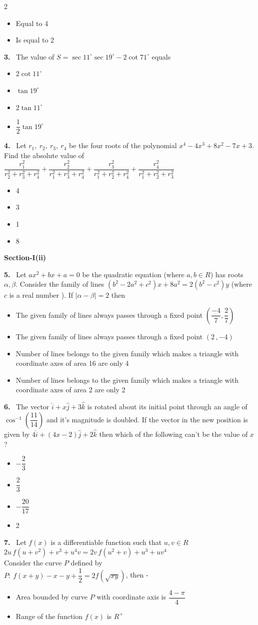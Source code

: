 \documentclass[10pt]{extarticle}
\newcommand{\sect}[1]{\par\smallskip\noindent\textbf{#1}\par}
\newcommand{\qn}[1]{\par\smallskip\noindent\textbf{#1.}~}
\newenvironment{qoptions}{\begin{itemize}[leftmargin=1.8em,itemsep=1pt,topsep=2pt,label={}]}{\end{itemize}}
\newcommand{\opt}[2]{\item[(#1)] #2}
\begin{document}
\begin{multicols}{2}
\begin{qoptions}
\opt{C}{Equal to 4}
\opt{D}{Is equal to 2}
\end{qoptions}
\qn{3} The value of $S=\sec11^\circ\sec19^\circ-2\cot71^\circ$ equals
\begin{qoptions}
\opt{A}{$2\cot11^\circ$}
\opt{B}{$\tan19^\circ$}
\opt{C}{$2\tan11^\circ$}
\opt{D}{$\dfrac12\tan19^\circ$}
\end{qoptions}
\qn{4} Let $r_1,\ r_2,\ r_3,\ r_4$ be the four roots of the polynomial $x^4-4x^3+8x^2-7x+3$. Find the absolute value of $\dfrac{r_1^2}{r_2^2+r_3^2+r_4^2}+\dfrac{r_2^2}{r_1^2+r_3^2+r_4^2}+\dfrac{r_3^2}{r_1^2+r_2^2+r_4^2}+\dfrac{r_4^2}{r_1^2+r_2^2+r_3^2}$
\begin{qoptions}
\opt{A}{4}
\opt{B}{3}
\opt{C}{1}
\opt{D}{8}
\end{qoptions}
\sect{Section-I(ii)}
\qn{5} Let $ax^2+bx+a=0$ be the quadratic equation (where $a,b\in R$) has roots $\alpha,\beta$. Consider the family of lines $\left(b^2-2a^2+c^2\right)x+8a^2=2\left(b^2-c^2\right)y$ (where $c$ is a real number ). If $|\alpha-\beta|=2$ then
\begin{qoptions}
\opt{A}{The given family of lines always passes through a fixed point $\left(\dfrac{-4}{7},\dfrac27\right)$}
\opt{B}{The given family of lines always passes through a fixed point $(2\,,-4)$}
\opt{C}{Number of lines belongs to the given family which makes a triangle with coordinate axes of area 16 are only 4}
\opt{D}{Number of lines belongs to the given family which makes a triangle with coordinate axes of area 2 are only 2}
\end{qoptions}
\qn{6} The vector $\hat i+x\hat j+3\hat k$ is rotated about its initial point through an angle of $\cos^{-1}\!\left(\dfrac{11}{14}\right)$ and it's magnitude is doubled. If the vector in the new position is given by $4\hat i+(4x-2)\hat j+2\hat k$ then which of the following can't be the value of $x$ ?
\begin{qoptions}
\opt{A}{$-\dfrac23$}
\opt{B}{$\dfrac23$}
\opt{C}{$-\dfrac{20}{17}$}
\opt{D}{2}
\end{qoptions}
\qn{7} Let $f(x)$ is a differentiable function such that $u,v\in R$\\
$2u\,f\!\left(u+v^2\right)+v^3+u^4v=2v\,f\!\left(u^2+v\right)+u^3+uv^4$\\
Consider the curve $P$ defined by\\
$P:\ f(x+y)-x-y+\dfrac12=2f\!\left(\sqrt{xy}\right)$, then -
\begin{qoptions}
\opt{A}{Area bounded by curve $P$ with coordinate axis is $\dfrac{4-\pi}{4}$}
\opt{B}{Range of the function $f(x)$ is $R^+$}

\end{qoptions}
\end{multicols}
\end{document}
